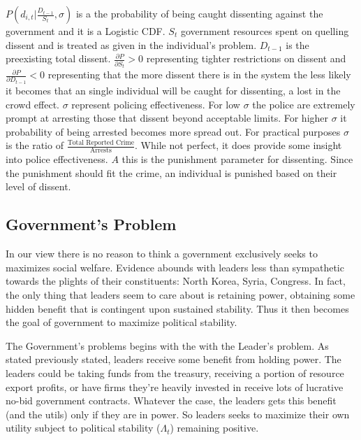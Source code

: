 \documentclass[12pt]{article}
\begin{document}
\begin{spacing}{1.5}
$P \left(d_{i,t} \Biggl|\frac{D_{t-1}}{S_t},\sigma \right)$ is a the probability of being caught dissenting against the government and it is a Logistic CDF. $S_t$ government resources spent on quelling dissent and is treated as given in the individual's problem. $D_{t-1}$ is the preexisting total dissent. $\frac{\partial P}{\partial S_t}>0$ representing tighter restrictions on dissent and $\frac{\partial P}{\partial D_{t-1}}<0$ representing that the more dissent there is in the system the less likely it becomes that an single individual will be caught for dissenting, a lost in the crowd effect. $\sigma$ represent policing effectiveness. For low $\sigma$ the police are extremely prompt at arresting those that dissent beyond acceptable limits. For higher $\sigma$ it probability of being arrested becomes more spread out. For practical purposes $\sigma$ is the ratio of $\frac{\text{Total Reported Crime}}{\text{Arrests}}$. While not perfect, it does provide some insight into police effectiveness. $A$ this is the punishment parameter for dissenting. Since the punishment should fit the crime, an individual is punished based on their level of dissent. 


\subsection{Government's Problem} 

In our view there is no reason to think a government exclusively seeks to maximizes social welfare. Evidence abounds with leaders less than sympathetic towards the plights of their constituents: North Korea, Syria, Congress. In fact, the only thing that leaders seem to care about is retaining power, obtaining some hidden benefit that is contingent upon sustained stability. Thus it then becomes the goal of government to maximize political stability. 

The Government's problems begins with the with the Leader's problem. As stated previously stated, leaders receive some benefit from holding power. The leaders could be taking funds from the treasury, receiving a portion of resource export profits, or have firms they're heavily invested in receive lots of lucrative no-bid government contracts. Whatever the case, the leaders gets this benefit (and the utils) only if they are in power. So leaders seeks to maximize their own utility subject to political stability ($\Lambda_t$) remaining positive.


\end{spacing}
\end{document}
